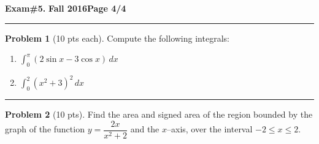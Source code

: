 \documentclass[12pt]{article}
\theoremstyle{definition}
\newtheorem{problem}{Problem}
\begin{document}
\hfill{\large\bf Exam\#5.}\hfill{\large\bf
Fall 2016}\hfill{\large\bf Page 4/4}\hrule

\bigskip

\begin{problem}[10 pts each] 
Compute the following integrals:
\begin{enumerate}
\item $\displaystyle{\int_0^{\pi} (2\sin x - 3\cos x) \, dx}$
\vspace{2.5cm}
\begin{flushright}
\end{flushright}
\item $\displaystyle{\int_0^2 (x^2+3)^2\, dx}$
\vspace{3cm}
\begin{flushright}
\end{flushright}
\end{enumerate}
\end{problem}
\hrule

\begin{problem}[10 pts] 
Find the area and signed area of the region bounded by the graph of the function $y=\dfrac{2x}{x^2+2}$ and the $x$--axis, over the interval $-2 \leq x \leq 2$.

\vspace{8cm}
\begin{flushright}
\end{flushright}
\end{problem}
\end{document}
